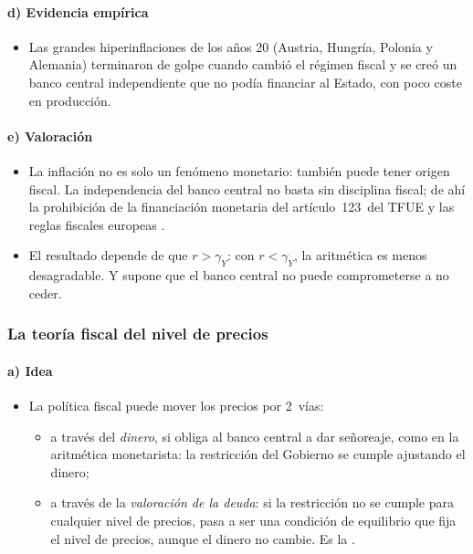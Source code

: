 \documentclass[11pt]{article}
\begin{document}
\paragraph{d) Evidencia empírica}

\begin{itemize}
\item Las grandes hiperinflaciones de los años 20 (Austria, Hungría, Polonia y Alemania) terminaron de golpe cuando cambió el régimen fiscal y se creó un banco central independiente que no podía financiar al Estado, con poco coste en producción\nocite{Sargent1982Ends}.
\end{itemize}

\paragraph{e) Valoración}

\begin{itemize}
\item La inflación no es solo un fenómeno monetario: también puede tener origen fiscal. La independencia del banco central no basta sin disciplina fiscal; de ahí la prohibición de la financiación monetaria del artículo~123~del TFUE\nocite{TFUE2016} y las reglas fiscales europeas .
\item El resultado depende de que $r>\gamma_Y$: con $r<\gamma_Y$, la aritmética es menos desagradable. Y supone que el banco central no puede comprometerse a no ceder.
\end{itemize}

\subsubsection{La teoría fiscal del nivel de precios}\label{sec:ftpl}

\paragraph{a) Idea}

\begin{itemize}
\item La política fiscal puede mover los precios por 2~vías\nocite{Walsh2017Monetary}:
  \begin{itemize}
  \item a través del \emph{dinero}, si obliga al banco central a dar señoreaje, como en la aritmética monetarista: la restricción del Gobierno se cumple ajustando el dinero;
  \item a través de la \emph{valoración de la deuda}: si la restricción no se cumple para cualquier nivel de precios, pasa a ser una condición de equilibrio que fija el nivel de precios, aunque el dinero no cambie. Es la \nocite{Leeper1991,Sims1994Simple,Woodford1995Price,Cochrane2023Fiscal}.
  \end{itemize}
\end{itemize}
\end{document}
